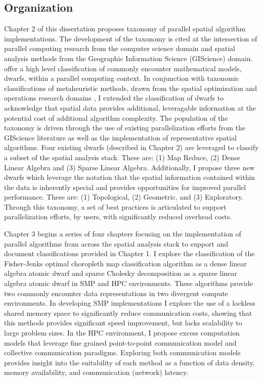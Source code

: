 \subsection*{Organization}
Chapter 2 of this dissertation proposes taxonomy of parallel spatial algorithm implementations.  The development of the taxonomy is cited at the intersection of parallel computing research from the computer science domain and spatial analysis methods from the Geographic Information Science (GIScience) domain.  \cite{Asanovic:2006aa} offer a high level classification of commonly encounter mathematical models, dwarfs, within a parallel computing context.  In conjunction with taxonomic classifications of metaheuristic methods, drawn from the spatial optimization and operations research domains \citep{Trienekens1992, Crainic1997, James:2009aa}, I extended the classification of dwarfs to acknowledge that spatial data provides additional, leveragable information at the potential cost of additional algorithm complexity.  The population of the taxonomy is driven through the use of existing parallelization efforts from the GIScience literature as well as the implementation of representative spatial algorithms.  Four existing dwarfs (described in Chapter 2) are leveraged to classify a subset of the spatial analysis stack.  These are: (1) Map Reduce, (2) Dense Linear Algebra and (3) Sparse Linear Algebra.  Additionally, I propose three new dwarfs which leverage the notation that the spatial information contained within the data is inherently special and provides opportunities for improved parallel performance.  These are: (1) Topological, (2) Geometric, and (3) Exploratory.  Through this taxonomy, a set of best practices is articulated to support parallelization efforts, by users, with significantly reduced overhead costs.

Chapter 3 begins a series of four chapters focusing on the implementation of parallel algorithms from across the spatial analysis stack to support and document classifications provided in Chapter 1. I explore the classification of the Fisher-Jenks optimal choropleth map classification algorithm \citep{Hartigan1975,Rey2013} as a dense linear algebra atomic dwarf and sparse Cholesky decomposition \citep{Santos:2003aa} as a sparse linear algebra atomic dwarf in SMP and HPC environments.  These algorithms provide two commonly encounter data representations in two divergent compute environments.  In developing SMP implementations I explore the use of a lockless shared memory space to significantly reduce communication costs, showing that this methods provides significant speed improvement, but lacks scalability to large problem sizes.  In the HPC environment, I propose excess computation models that leverage fine grained point-to-point communication model and collective communication paradigms.  Exploring both communication models provides insight into the suitability of each method as a function of data density, memory availability, and communication (network) latency.

